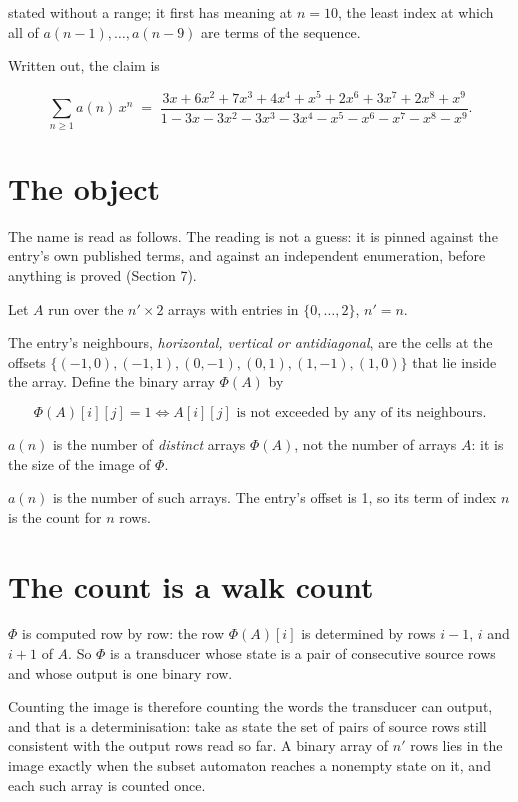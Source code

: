 \documentclass[11pt]{article}
\theoremstyle{definition}
\begin{document}
stated without a range; it first has meaning at $n = 10$, the least index at which all of $a(n-1),\dots,a(n-9)$ are terms of the sequence.

Written out, the claim is

\[\sum_{n \ge 1} a(n)\,x^n \;=\; \frac{3x + 6x^{2} + 7x^{3} + 4x^{4} + x^{5} + 2x^{6} + 3x^{7} + 2x^{8} + x^{9}}{1 - 3x - 3x^{2} - 3x^{3} - 3x^{4} - x^{5} - x^{6} - x^{7} - x^{8} - x^{9}}.\]

\section{The object}

The name is read as follows. The reading is not a guess: it is pinned against the entry's own published terms, and against an independent enumeration, before anything is proved (Section 7).

Let $A$ run over the $n' \times 2$ arrays with entries in $\{0,\dots,2\}$, $n' = n$.

The entry's neighbours, {\itshape horizontal, vertical or antidiagonal}, are the cells at the offsets $\{(-1,0), (-1,1), (0,-1), (0,1), (1,-1), (1,0)\}$ that lie inside the array. Define the binary array $\Phi(A)$ by

\[\Phi(A)[i][j] = 1 \iff A[i][j] \text{ is not exceeded by any of its neighbours}.\]

$a(n)$ is the number of {\itshape distinct} arrays $\Phi(A)$, not the number of arrays $A$: it is the size of the image of $\Phi$.

$a(n)$ is the number of such arrays. The entry's offset is 1, so its term of index $n$ is the count for $n$ rows.

\section{The count is a walk count}

$\Phi$ is computed row by row: the row $\Phi(A)[i]$ is determined by rows $i-1$, $i$ and $i+1$ of $A$. So $\Phi$ is a transducer whose state is a pair of consecutive source rows and whose output is one binary row.

Counting the image is therefore counting the words the transducer can output, and that is a determinisation: take as state the set of pairs of source rows still consistent with the output rows read so far. A binary array of $n'$ rows lies in the image exactly when the subset automaton reaches a nonempty state on it, and each such array is counted once.
\end{document}
